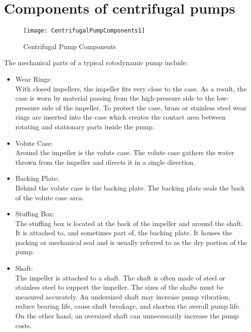 \section{Components of centrifugal pumps}


\begin{figure}[h!]
\begin{center}
\texttt{[image: CentrifugalPumpComponents1]}
\caption{Centrifugal Pump Components}
\end{center}
\end{figure}

The mechanical parts of a typical rotodynamic pump include:
\begin{itemize}

\item Wear Rings:\\
With closed impellers, the impeller fits very close to the case. As a result, the case is worn by material passing from the high-pressure side to the low-pressure side of the impeller. To protect the case, brass or stainless steel wear rings are inserted into the case which creates the contact area between rotating and stationary parts inside the pump.

\item Volute Case:\\
Around the impeller is the volute case. The volute case gathers the water thrown from the impeller and directs it in a single direction.

\item Backing Plate:\\
Behind the volute case is the backing plate. The backing plate seals the back of the volute case area.

\item Stuffing Box:\\
The stuffing box is located at the back of the impeller and around the shaft.   It is attached to, and sometimes part of, the backing plate.  It houses the packing or mechanical seal and is usually referred to as the dry portion of the pump.

\item Shaft:  \\
The impeller is attached to a shaft. The shaft is often made of steel or stainless steel to support the impeller. The sizes of the shafts must be measured accurately. An undersized shaft may increase pump vibration, reduce bearing life, cause shaft breakage, and shorten the overall pump life. On the other hand, an oversized shaft can unnecessarily increase the pump costs.


\end{itemize}
